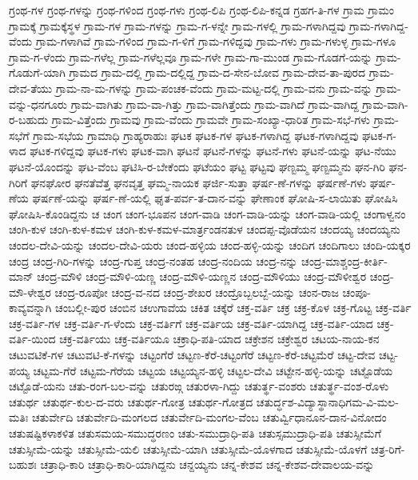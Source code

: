 {ಗ್ರಂಥ-ಗಳ
ಗ್ರಂಥ-ಗಳನ್ನು
ಗ್ರಂಥ-ಗಳಿಂದ
ಗ್ರಂಥ-ಗಳು
ಗ್ರಂಥ-ಲಿಪಿ
ಗ್ರಂಥ-ಲಿಪಿ-ಕನ್ನಡ
ಗ್ರಹಗ-ತಿ-ಗಳ
ಗ್ರಾಮ
ಗ್ರಾಮಂ
ಗ್ರಾಮಕ್ಕೆ
ಗ್ರಾಮಕ್ಕೆಸ್ಥಳ
ಗ್ರಾಮ-ಗಳ
ಗ್ರಾಮ-ಗಳನ್ನು
ಗ್ರಾಮ-ಗ-ಳನ್ನೇ
ಗ್ರಾಮ-ಗಳಲ್ಲಿ
ಗ್ರಾಮ-ಗಳಾಗಿದ್ದವು
ಗ್ರಾಮ-ಗಳಾಗಿದ್ದ-ವೆಂದು
ಗ್ರಾಮ-ಗಳಾಗಿವೆ
ಗ್ರಾಮ-ಗಳಿಂದ
ಗ್ರಾಮ-ಗ-ಳಿಗೆ
ಗ್ರಾಮ-ಗಳಿದ್ದವು
ಗ್ರಾಮ-ಗಳು
ಗ್ರಾಮ-ಗಳುಳ್ಳ
ಗ್ರಾಮ-ಗಳೂ
ಗ್ರಾಮ-ಗ-ಳೆಂದು
ಗ್ರಾಮ-ಗಳೆಲ್ಲ
ಗ್ರಾಮ-ಗಳೆಲ್ಲವೂ
ಗ್ರಾಮ-ಗಳೇ
ಗ್ರಾಮ-ಗಾ-ಮುಂಡ
ಗ್ರಾಮ-ಗೊಡಗೆ-ಯನ್ನು
ಗ್ರಾಮ-ಗೊಡುಗೆ-ಯಾಗಿ
ಗ್ರಾಮದ
ಗ್ರಾಮ-ದಲ್ಲಿ
ಗ್ರಾಮ-ದಲ್ಲಿದ್ದ
ಗ್ರಾಮ-ದ-ಸೇನ-ಬೋವ
ಗ್ರಾಮ-ದೇವ-ತಾ-ಪುರದ
ಗ್ರಾಮ-ದೇವ-ತೆಯು
ಗ್ರಾಮ-ನಾ-ಮ-ಗಳನ್ನು
ಗ್ರಾಮ-ಪಂಚಕ-ವೆಂದು
ಗ್ರಾಮ-ಮಟ್ಟ-ದಲ್ಲಿ
ಗ್ರಾಮ-ವನು
ಗ್ರಾಮ-ವನ್ನು
ಗ್ರಾಮ-ವನ್ನು-ಧನಗೂರು
ಗ್ರಾಮ-ವಾಗಿತು
ಗ್ರಾಮ-ವಾ-ಗಿತ್ತು
ಗ್ರಾಮ-ವಾಗಿತ್ತೆಂದು
ಗ್ರಾಮ-ವಾಗಿದೆ
ಗ್ರಾಮ-ವಾಗಿದ್ದ
ಗ್ರಾಮ-ವಾಗಿ-ರ-ಬಹುದು
ಗ್ರಾಮ-ವಿತ್ತೆಂದು
ಗ್ರಾಮವು
ಗ್ರಾಮ-ವೆಂದು
ಗ್ರಾಮವೇ
ಗ್ರಾಮ-ಸಂಖ್ಯಾ-ಧಾರಿತ
ಗ್ರಾಮ-ಸಭೆ-ಗಳು
ಗ್ರಾಮ-ಸಭೆಗೆ
ಗ್ರಾಮ-ಸಭೆಯ
ಗ್ರಾಮಾಧಿ
ಗ್ರಾಹ್ಯರಾಹುಃ
ಘಟಕ
ಘಟಕ-ಗಳ
ಘಟಕ-ಗಳಾಗಿದ್ದ
ಘಟಕ-ಗಳಾಗಿದ್ದವು
ಘಟಕ-ಗ-ಳಾದ
ಘಟಕ-ಗಳಿದ್ದವು
ಘಟಕ-ಗಳು
ಘಟಕ-ವಾಗಿ
ಘಟನೆ
ಘಟನೆ-ಗಳನ್ನು
ಘಟನೆ-ಗಳು
ಘಟನೆ-ಯನ್ನು
ಘಟ-ನೆಯು
ಘಟನೆ-ಯೊಂದನ್ನು
ಘಟ-ವೆಂಬ
ಘಟಿಸಿ-ರ-ಬೇಕೆಂದು
ಘಟೆಯಂ
ಘಟ್ಟ
ಘಟ್ಟವು
ಘಣ್ಟಮ್ಮ
ಘಣ್ಟಮ್ಮನು
ಘನ-ಗಿರಿ
ಘನ-ಗಿರಿಗೆ
ಘನಘೋರ
ಘನತೆವೆತ್ತ
ಘನವೃತ್ತ
ಘಮ್ಮ-ನಾಯಕ
ಘರ್ಜಿ-ಸುತ್ತಾ
ಘರ್ಷ-ಣೆ-ಗಳನ್ನು
ಘರ್ಷಣೆ-ಗಳು
ಘರ್ಷ-ಣೆಯ
ಘರ್ಷಣೆ-ಯನ್ನು
ಘರ್ಷ-ಣೆ-ಯಲ್ಲಿ
ಘೃತ-ಪರ್ವ-ತ-ದಾನ-ವನ್ನು
ಘೇಣಾಂಕ
ಘೋಷಿ-ಸ-ಲಾಯಿತು
ಘೋಷಿಸಿ
ಘೋಷಿಸಿ-ಕೊಂಡಿದ್ದನು
ಚ
ಚಂಗ
ಚಂಗ-ಭೂಪನ
ಚಂಗ-ವಾಡಿ
ಚಂಗ-ವಾಡಿ-ಯನ್ನು
ಚಂಗ-ವಾಡಿ-ಯಲ್ಲಿ
ಚಂಗಾಳ್ವನಂ
ಚಂಗಿ-ಕುಳ
ಚಂಗಿ-ಕುಳ-ಕಮಳ
ಚಂಗಿ-ಕುಳ-ಕಮಳ-ಮಾರ್ತ್ರಂಡನತುಳ
ಚಂದಪ್ಪ-ವೊಡೆಯನ
ಚಂದಯ್ಯ
ಚಂದಯ್ಯನು
ಚಂದಲ-ದೇವಿ-ಯನ್ನು
ಚಂದಲ-ದೇವಿ-ಯರು
ಚಂದ-ಹಳ್ಳಿಯ
ಚಂದ-ಹಳ್ಳಿ-ಯನ್ನು
ಚಂದಿಗ
ಚಂದಿಗಾಲು
ಚಂದಿ-ಯಕ್ಕರ
ಚಂದ್ರ
ಚಂದ್ರ-ಗಿರಿ-ಗಳನ್ನು
ಚಂದ್ರ-ಗುಪ್ತ
ಚಂದ್ರ-ನಂತಹ
ಚಂದ್ರ-ನಂದಿಯ
ಚಂದ್ರ-ನನ್ನು
ಚಂದ್ರ-ಮಾಶ್ಚಂದ್ರ-ಕೀರ್ತಿ-ಮಾನ್
ಚಂದ್ರ-ಮೌಳಿ
ಚಂದ್ರ-ಮೌಳಿ-ಯಣ್ಣ
ಚಂದ್ರ-ಮೌಳಿ-ಯಣ್ಣನ
ಚಂದ್ರ-ಮೌಳಿಯು
ಚಂದ್ರ-ಮೌಳೀಶ್ವರ
ಚಂದ್ರ-ಮೌ-ಳೇಶ್ವರ
ಚಂದ್ರ-ರೂಪೋ
ಚಂದ್ರ-ವ-ನದ
ಚಂದ್ರ-ಶೇಖರ
ಚಂದ್ರೊಬ್ಬಲಬ್ಬೆ-ಯನ್ನು
ಚಂನ-ರಾಜ
ಚಂಪೂ-ಕಾವ್ಯವನ್ನಾಗಿ
ಚಂಬಲ್ಲೀ-ಪುರ
ಚಂಬಿನ
ಚಉಗಾವೆಯ
ಚಕಿತ
ಚಕ್ಕೆರೆ
ಚಕ್ತ-ವರ್ತಿ
ಚಕ್ರ
ಚಕ್ರ-ಕೊಳ
ಚಕ್ರ-ಗೊಟ್ಟ
ಚಕ್ರ-ವರ್ತಿ
ಚಕ್ರ-ವರ್ತಿ-ಗಳ
ಚಕ್ರ-ವರ್ತಿ-ಗ-ಳೆಂದು
ಚಕ್ರ-ವರ್ತಿಗೆ
ಚಕ್ರ-ವರ್ತಿಯ
ಚಕ್ರ-ವರ್ತಿ-ಯಾಗಿದ್ದ
ಚಕ್ರ-ವರ್ತಿ-ಯಾದ
ಚಕ್ರ-ವರ್ತಿ-ಯಿಂದ
ಚಕ್ರ-ವರ್ತಿಯು
ಚಕ್ರ-ವರ್ತಿಯೂ
ಚಕ್ರಾಧಿ-ಪತಿ-ಯಾದ
ಚಕ್ರೇಶನ
ಚಕ್ರೇಶ್ವರ
ಚಟಯ-ನಾಯ-ಕನ
ಚಟುವಟಿಕೆ-ಗಳ
ಚಟುವಟಿ-ಕೆ-ಗಳನ್ನು
ಚಟ್ಟಂಗೆರೆ
ಚಟ್ಟಣ-ಕೆರೆ-ಚಟ್ಟಂಗೆರೆ
ಚಟ್ಟಣ-ಕೆರೆ-ಚಟ್ಟಮೆರೆ
ಚಟ್ಟ-ದೇವ
ಚಟ್ಟ-ಪಯ್ಯ
ಚಟ್ಟಮ-ಗೆರೆ
ಚಟ್ಟಮ-ಗೆರೆಯ
ಚಟ್ಟಯ
ಚಟ್ಟಯ್ಯನ-ಹಳ್ಳಿ
ಚಟ್ಟಲ-ದೇವಿ
ಚಟ್ಟೇನ-ಹಳ್ಳಿ-ಯನ್ನು
ಚಟ್ಟೊಡೆಯ
ಚಟ್ಟೊಡೆ-ಯನು
ಚತು-ರಂಗ-ಬಲ-ವನ್ನು
ಚತುರಙ್ಗ
ಚತುರಳಾ-ಗಿದ್ದು
ಚತುರ್ತ್ಥ-ವಂಶರು
ಚತುರ್ತ್ಥ-ವಂಶ-ರೊಳು
ಚತುರ್ಥ
ಚತುರ್ಥ-ಕುಲ-ದ-ವರು
ಚತುರ್ಥ-ಗೋತ್ರ
ಚತುರ್ಥ-ಗೋತ್ರದ
ಚತುರ್ದ್ಧಶ-ವಿದ್ಯಾಸ್ಥಾನಾಧಿಗಮ-ವಿ-ಮಲ-ಮತಿಃ
ಚತುರ್ವೇದಿ
ಚತುರ್ವೇದಿ-ಮಂಗಲದ
ಚತುರ್ವೇದಿ-ಮಂಗಲ-ವೆಂಬ
ಚತುರ್ವ್ವಿಧಾನೂನ-ದಾನ-ವಿನೋದಂ
ಚತುಷಷ್ಟಿಕಳಾಕಳಿತ
ಚತುಸಮಯ-ಸಮುದ್ಧರಣಂ
ಚತು-ಸಮುದ್ರಾಧಿ-ಪತಿ
ಚತುಸ್ಸಮುದ್ರಾಧಿ-ಪತಿ
ಚತುಸ್ಸೀಮೆಗೆ
ಚತುಸ್ಸೀಮೆ-ಯನ್ನು
ಚತುಸ್ಸೀಮೆ-ಯಲಿ
ಚತುಸ್ಸೀಮೆ-ಯಾಗಿ
ಚತುಸ್ಸೀಮೆ-ಯೊಳಗಾದ
ಚತುಸ್ಸೀಮೆ-ಯೊಳಗೆ
ಚತ್ರ-ರಿಗೆ-ಬಹುಶಃ
ಚತ್ರಾಧಿ-ಕಾರಿ
ಚತ್ರಾಧಿ-ಕಾರಿ-ಯಾಗಿದ್ದನು
ಚನ್ದಯ್ಯನು
ಚನ್ನ-ಕೇಶವ
ಚನ್ನ-ಕೇಶವ-ದೇವಾಲಯ-ವನ್ನು
}
